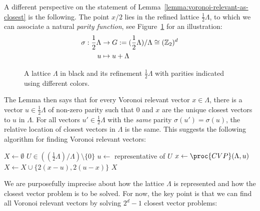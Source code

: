 A different perspective on the statement of Lemma~\ref{lemma:voronoi-relevant-as-closest}
is the following.
The point $x/2$ lies in the refined lattice $\frac{1}{2} \Lambda$,
to which we can associate a natural \emph{parity function},
see Figure~\ref{fig:lattice-refinement-parity} for an illustration:
\begin{align*}
  \sigma : \frac{1}{2} \Lambda &\to G := (\frac{1}{2} \Lambda) / \Lambda \cong (\mathbb{Z}_2)^d \\
                   u &\mapsto u + \Lambda
\end{align*}%
\begin{figure}
  \begin{center}
  \end{center}
  \caption{A lattice $\Lambda$ in black and its refinement $\frac{1}{2} \Lambda$
    with parities indicated using different colors.}
  \label{fig:lattice-refinement-parity}
\end{figure}%
The Lemma then says that for every Voronoi relevant vector $x \in \Lambda$,
there is a vector $u \in \frac{1}{2} \Lambda$ of non-zero parity
such that $0$ and $x$ are the unique closest vectors to $u$ in $\Lambda$.
For all vectors $u' \in \frac{1}{2} \Lambda$ with the \emph{same} parity $\sigma(u') = \sigma(u)$,
the relative location of closest vectors in $\Lambda$ is the same.
This suggests the following algorithm for finding Voronoi relevant vectors:
\begin{codebox}
  \li $X \gets \emptyset$
  \li \For $U \in \left((\frac{1}{2} \Lambda) / \Lambda\right) \setminus \{ 0 \}$
  \li \Do $u \gets$ representative of $U$
  \li     $x \gets \proc{CVP}(\Lambda, u)$
  \li     $X \gets X \cup \{ 2(x - u), 2(u - x) \}$
      \End
  \li \Return $X$
\end{codebox}
We are purposefully imprecise about how the lattice $\Lambda$ is represented
and how the closest vector problem is to be solved.
For now, the key point is that we can find all Voronoi relevant vectors
by solving $2^d - 1$ closest vector problems:

